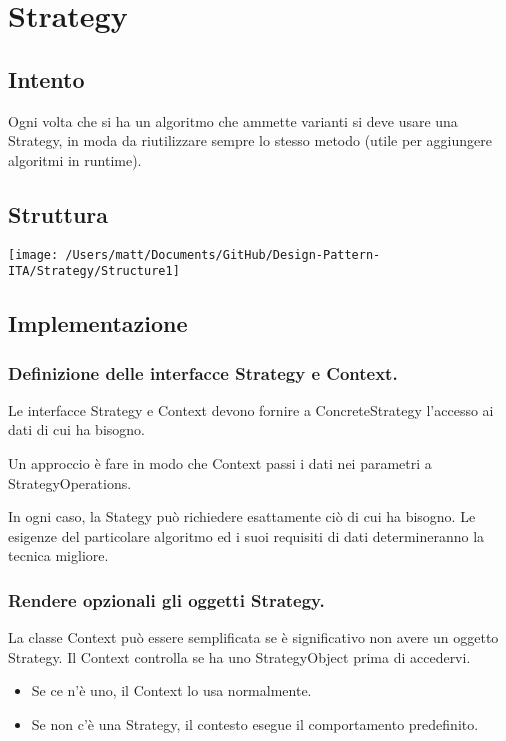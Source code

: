 \chapter{Strategy}
\section{Intento}

Ogni volta che si ha un algoritmo che ammette varianti si deve usare una Strategy, in moda da riutilizzare sempre lo stesso metodo (utile per aggiungere algoritmi in runtime).


\section{Struttura}

\texttt{[image: /Users/matt/Documents/GitHub/Design-Pattern-ITA/Strategy/Structure1]}


\section{Implementazione}

\subsection{Definizione delle interfacce Strategy e Context.}
Le interfacce Strategy e Context devono fornire a ConcreteStrategy l'accesso ai dati di cui ha bisogno.

Un approccio è fare in modo che Context passi i dati nei parametri a StrategyOperations.

In ogni caso, la Stategy può richiedere esattamente ciò di cui ha bisogno. Le esigenze del particolare algoritmo ed i suoi requisiti di dati determineranno la tecnica migliore.

\subsection{Rendere opzionali gli oggetti Strategy.}
La classe Context può essere semplificata se è significativo non avere un oggetto Strategy. Il Context controlla se ha uno StrategyObject prima di accedervi.

\begin{itemize}
    \item Se ce n'è uno, il Context lo usa normalmente.

    \item Se non c'è una Strategy, il contesto esegue il comportamento predefinito.
\end{itemize}

